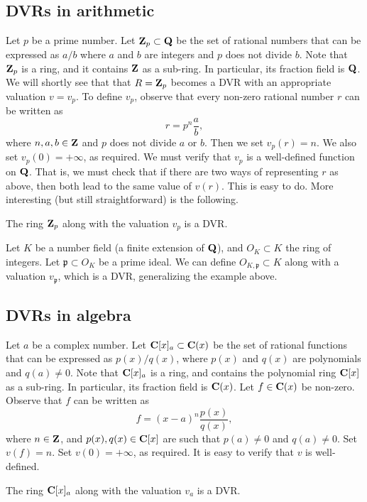 \documentclass[12pt]{article}
\begin{document}
\subsection{DVRs in arithmetic}
Let $p$ be a prime number.
Let ${\bf Z}_p \subset {\bf Q}$ be the set of rational numbers that can be expressed as $a / b$ where $a$ and $b$ are integers and $p$ does not divide $b$.
Note that ${\bf Z}_p$ is a ring, and it contains ${\bf Z}$ as a sub-ring.
In particular, its fraction field is ${\bf Q}$.
We will shortly see that that $R = {\bf Z}_p$ becomes a DVR with an appropriate valuation $v = v_p$.
To define $v_p$, observe that every non-zero rational number $r$ can be written as
\[ r = p^n \frac{a}{b},\]
where $n, a, b \in {\bf Z}$ and $p$ does not divide $a$ or $b$.
Then we set $v_p(r) = n$.
We also set $v_p(0) = +\infty$, as required.
We must verify that $v_p$ is a well-defined function on ${\bf Q}$.
That is, we must check that if there are two ways of representing $r$ as above, then both lead to the same value of $v(r)$.
This is easy to do.
More interesting (but still straightforward) is the following.
\begin{proposition}
  The ring ${\bf Z}_p$ along with the valuation $v_p$ is a DVR.
\end{proposition}

\begin{remark}
  Let $K$ be a number field (a finite extension of ${\bf Q}$), and $O_K \subset K$ the ring of integers.
  Let $\mathfrak p \subset O_K$ be a prime ideal.
  We can define $O_{K, \mathfrak p} \subset K$ along with a valuation $v_{\mathfrak p}$, which is a DVR, generalizing the example above. 
\end{remark}

\subsection{DVRs in algebra}
Let $a$ be a complex number.
Let ${\bf C}[x]_a \subset {\bf C}(x)$ be the set of rational functions
that can be expressed as $p(x)/q(x)$, where $p(x)$ and $q(x)$ are polynomials and $q(a) \neq 0$.
Note that ${\bf C}[x]_a$ is a ring, and contains the polynomial ring ${\bf C}[x]$ as a sub-ring.
In particular, its fraction field is ${\bf C}(x)$.
Let $f \in {\bf C}(x)$ be non-zero.
Observe that $f$ can be written as
\[ f = (x-a)^n \frac{p(x)}{q(x)},\]
where $n \in {\bf Z}$, and $p(x), q(x) \in {\bf C}[x]$ are such that $p(a) \neq 0$ and $q(a) \neq 0$.
Set $v(f) = n$.
Set $v(0) = +\infty$, as required.
It is easy to verify that $v$ is well-defined.
\begin{proposition}
  The ring ${\bf C}[x]_a$ along with the valuation $v_a$ is a DVR.
\end{proposition}
\end{document}
